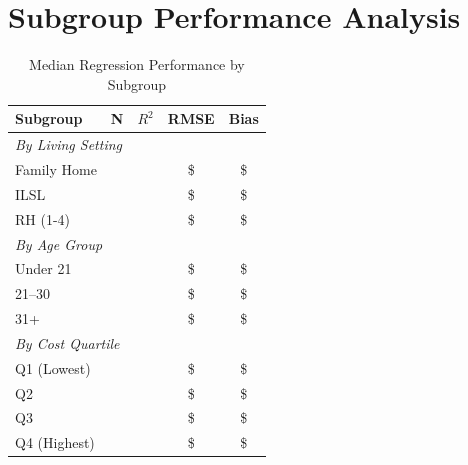 \section{Subgroup Performance Analysis}

\begin{table}[h]
\centering
\caption{Median Regression Performance by Subgroup}
\begin{tabular}{lcccc}
\toprule
\textbf{Subgroup} & \textbf{N} & \textbf{$R^2$} & \textbf{RMSE} & \textbf{Bias} \\
\midrule
\multicolumn{5}{l}{\textit{By Living Setting}} \\
Family Home & \ModelSevenSubgrouplivingFHN{} & \ModelSevenSubgrouplivingFHRSquared{} & \$\ModelSevenSubgrouplivingFHRMSE{} & \$\ModelSevenSubgrouplivingFHBias{} \\
ILSL & \ModelSevenSubgrouplivingILSLN{} & \ModelSevenSubgrouplivingILSLRSquared{} & \$\ModelSevenSubgrouplivingILSLRMSE{} & \$\ModelSevenSubgrouplivingILSLBias{} \\
RH (1-4) & \ModelSevenSubgrouplivingRHOneToFourN{} & \ModelSevenSubgrouplivingRHOneToFourRSquared{} & \$\ModelSevenSubgrouplivingRHOneToFourRMSE{} & \$\ModelSevenSubgrouplivingRHOneToFourBias{} \\
\midrule
\multicolumn{5}{l}{\textit{By Age Group}} \\
Under 21 & \ModelSevenSubgroupageAgeUnderTwentyOneN{} & \ModelSevenSubgroupageAgeUnderTwentyOneRSquared{} & \$\ModelSevenSubgroupageAgeUnderTwentyOneRMSE{} & \$\ModelSevenSubgroupageAgeUnderTwentyOneBias{} \\
21--30 & \ModelSevenSubgroupageAgeTwentyOneToThirtyN{} & \ModelSevenSubgroupageAgeTwentyOneToThirtyRSquared{} & \$\ModelSevenSubgroupageAgeTwentyOneToThirtyRMSE{} & \$\ModelSevenSubgroupageAgeTwentyOneToThirtyBias{} \\
31+ & \ModelSevenSubgroupageAgeThirtyOnePlusN{} & \ModelSevenSubgroupageAgeThirtyOnePlusRSquared{} & \$\ModelSevenSubgroupageAgeThirtyOnePlusRMSE{} & \$\ModelSevenSubgroupageAgeThirtyOnePlusBias{} \\
\midrule
\multicolumn{5}{l}{\textit{By Cost Quartile}} \\
Q1 (Lowest) & \ModelSevenSubgroupcostQOneLowN{} & \ModelSevenSubgroupcostQOneLowRSquared{} & \$\ModelSevenSubgroupcostQOneLowRMSE{} & \$\ModelSevenSubgroupcostQOneLowBias{} \\
Q2 & \ModelSevenSubgroupcostQTwoN{} & \ModelSevenSubgroupcostQTwoRSquared{} & \$\ModelSevenSubgroupcostQTwoRMSE{} & \$\ModelSevenSubgroupcostQTwoBias{} \\
Q3 & \ModelSevenSubgroupcostQThreeN{} & \ModelSevenSubgroupcostQThreeRSquared{} & \$\ModelSevenSubgroupcostQThreeRMSE{} & \$\ModelSevenSubgroupcostQThreeBias{} \\
Q4 (Highest) & \ModelSevenSubgroupcostQFourHighN{} & \ModelSevenSubgroupcostQFourHighRSquared{} & \$\ModelSevenSubgroupcostQFourHighRMSE{} & \$\ModelSevenSubgroupcostQFourHighBias{} \\
\bottomrule
\end{tabular}
\end{table}

